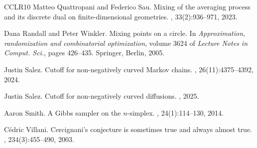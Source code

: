 \documentclass[11pt,reqno]{amsart}
\theoremstyle{remark}
\theoremstyle{definition}
\numberwithin{equation}{section}
\numberwithin{figure}{section}
\begin{document}
\begin{thebibliography}{CCLR{\etalchar{+}}10}
	Matteo Quattropani and Federico Sau.
	\newblock Mixing of the averaging process and its discrete dual on
	finite-dimensional geometries.
	, 33(2):936--971, 2023.
	
	Dana Randall and Peter Winkler.
	\newblock Mixing points on a circle.
	\newblock In {\em Approximation, randomization and combinatorial optimization},
	volume 3624 of {\em Lecture Notes in Comput. Sci.}, pages 426--435. Springer,
	Berlin, 2005.
	
	Justin Salez.
	\newblock Cutoff for non-negatively curved {M}arkov chains.
	, 26(11):4375--4392, 2024.
	
	Justin Salez.
	\newblock Cutoff for non-negatively curved diffusions.
	, 2025.
	
	Aaron Smith.
	\newblock A {G}ibbs sampler on the {$n$}-simplex.
	, 24(1):114--130, 2014.
	
	C\'edric Villani.
	\newblock Cercignani's conjecture is sometimes true and always almost true.
	, 234(3):455--490, 2003.
	
\end{thebibliography}
\end{document}
